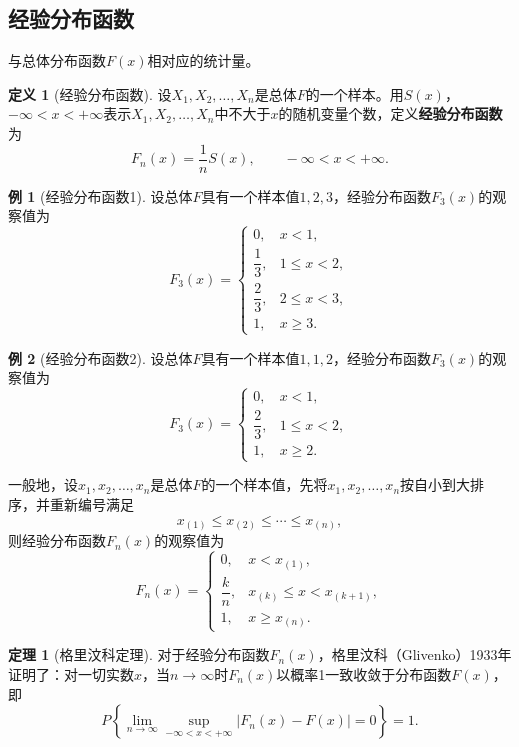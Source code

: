 \documentclass[11pt,a4paper]{report}
\theoremstyle{definition}
\newtheorem{definition}{定义}[chapter]
\newtheorem{example}{例}[chapter]
\newtheorem{theorem}{定理}[chapter]
\begin{document}
\subsection{经验分布函数}

与总体分布函数$F(x)$相对应的统计量。

\begin{definition}[经验分布函数]
设$X_{1},X_{2},\ldots,X_{n}$是总体$F$的一个样本。用$S(x)$，$-\infty<x<+\infty$表示$X_{1},X_{2},\ldots,X_{n}$中不大于$x$的随机变量个数，定义\textbf{经验分布函数}为
\[
F_{n}(x)=\frac{1}{n}S(x),\qquad -\infty<x<+\infty.
\]
\end{definition}

\begin{example}[经验分布函数1]
设总体$F$具有一个样本值$1,2,3$，经验分布函数$F_{3}(x)$的观察值为
\[
F_{3}(x)=
\begin{cases}
0, & x<1,\\[0.3em]
\dfrac{1}{3}, & 1\leq x<2,\\[0.3em]
\dfrac{2}{3}, & 2\leq x<3,\\[0.3em]
1, & x\geq 3.
\end{cases}
\]
\end{example}

\begin{example}[经验分布函数2]
设总体$F$具有一个样本值$1,1,2$，经验分布函数$F_{3}(x)$的观察值为
\[
F_{3}(x)=
\begin{cases}
0, & x<1,\\[0.3em]
\dfrac{2}{3}, & 1\leq x<2,\\[0.3em]
1, & x\geq 2.
\end{cases}
\]
\end{example}

一般地，设$x_{1},x_{2},\ldots,x_{n}$是总体$F$的一个样本值，先将$x_{1},x_{2},\ldots,x_{n}$按自小到大排序，并重新编号满足
\[
x_{(1)}\leq x_{(2)}\leq\cdots\leq x_{(n)},
\]
则经验分布函数$F_{n}(x)$的观察值为
\[
F_{n}(x)=
\begin{cases}
0, & x<x_{(1)},\\[0.3em]
\dfrac{k}{n}, & x_{(k)}\leq x<x_{(k+1)},\\[0.3em]
1, & x\geq x_{(n)}.
\end{cases}
\]

\begin{theorem}[格里汶科定理]
对于经验分布函数$F_{n}(x)$，格里汶科（Glivenko）1933年证明了：对一切实数$x$，当$n\to\infty$时$F_{n}(x)$以概率1一致收敛于分布函数$F(x)$，即
\[
P\left\{\lim_{n\to\infty}\sup_{-\infty<x<+\infty}|F_{n}(x)-F(x)|=0\right\}=1.
\]
\end{theorem}
\end{document}
